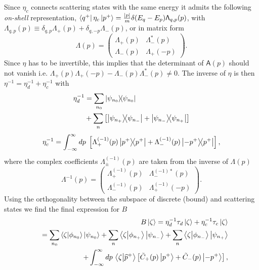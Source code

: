 Since $\eta_c$ connects scattering states with the same energy it admits the following \textit{on-shell} representation, $\bra{q^+}\eta_c\ket{p^+} = \frac{|p|}{m}\delta(E_q-E_p) \mathsf{\Lambda}_{q,p}(p)$, with $\mathsf{\Lambda}_{q,p}(p) \equiv \delta_{q,p} \Lambda_+(p) + \delta_{q,-p} \Lambda_-(p)$, or in matrix form
%
\begin{equation}
    \mathsf{\Lambda}(p)
    =
    \left(
    \begin{matrix}
        \Lambda_+(p) & \Lambda_-^*(p) \\
        \Lambda_-(p) & \Lambda_+(-p)
    \end{matrix}
    \right).
    \label{eq:onShellEtaContinuous}
\end{equation}
%
Since $\eta$ has to be invertible, this implies that the determinant of $\mathsf{A}(p)$ should not vanish i.e. $\Lambda_+(p) \Lambda_+(-p) - \Lambda_-(p) \Lambda_-^*(p) \neq 0$. The inverse of $\eta$ is then $\eta^{-1} = \eta_d^{-1} + \eta_c^{-1}$ with
%
\begin{equation}
  \begin{split}
  \eta_d^{-1} &= \sum_{n_0} \ketbra{\psi_{n_0}}{\psi_{n_0}}\\
  &+\sum_{n} \left[\ketbra{\psi_{n_+}}{\psi_{n_-}} + \ketbra{\psi_{n_-}}{\psi_{n_+}}\right]
\end{split}
\end{equation}
%
\begin{equation}
    \eta_c^{-1} = \int_{-\infty}^\infty dp\; \left[\Lambda_+^{(-1)}(p)\ketbra{p^+}{p^+} + \Lambda_-^{(-1)}(p)\ketbra{-p^+}{p^+}\right],
\end{equation}
%
where the complex coefficients $\Lambda_\pm^{(-1)}(p)$ are taken from the inverse of $\mathsf{\Lambda}(p)$
%
\begin{equation}
  \mathsf{\Lambda}^{-1}(p)
  =
  \left(
  \begin{matrix}
      \Lambda_+^{(-1)}(p) & \Lambda_-^{(-1)*}(p) \\
      \Lambda_-^{(-1)}(p) & \Lambda_+^{(-1)}(-p)
  \end{matrix}
  \right).
  \label{eq:onShellEtaContinuous2}
\end{equation}
%
Using the orthogonality between the subspace of discrete (bound) and scattering states we find the final expression for $B$
%
\begin{eqnarray}
  &&B\ket{\zeta} = \eta_d^{-1}\tau_d\ket{\zeta}+  \eta_c^{-1}\tau_c\ket{\zeta}\nonumber\\
  &&=\sum_{n_0}\braket{\zeta}{\phi_{n_0}}\ket{\psi_{n_0}}
  +\sum_{n}\braket{\zeta}{\phi_{n_+}}\ket{\psi_{n_-}}
  +\sum_{n}\braket{\zeta}{\phi_{n_-}}\ket{\psi_{n_+}}\nonumber\\
  &&+\int_{-\infty}^{\infty}dp\,\braket{\zeta}{\widehat{p}^+}
  \left[ \tilde{C}_+(p)\ket{p^+} + \tilde{C}_-(p)\ket{-p^+} \right],\nonumber\\
\end{eqnarray}
